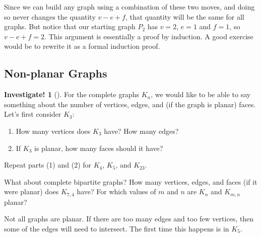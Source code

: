 \documentclass[10pt,]{book}
\theoremstyle{plain}
\theoremstyle{definition}
\theoremstyle{definition}
\theoremstyle{definition}
\newtheorem{investigation}[project]{Investigate!}
\theoremstyle{definition}
\numberwithin{equation}{chapter}
\begin{document}
\par
\hypertarget{p-1602}{}%
Since we can build any graph using a combination of these two moves, and doing so never changes the quantity \(v - e + f\), that quantity will be the same for all graphs. But notice that our starting graph \(P_2\) has \(v = 2\), \(e = 1\) and \(f = 1\), so \(v - e + f = 2\). This argument is essentially a proof by induction. A good exercise would be to rewrite it as a formal induction proof.%
\typeout{************************************************}
\typeout{************************************************}
\subsection[{Non-planar Graphs}]{Non-planar Graphs}\label{subsection-27}
\begin{investigation}[]\label{investigation-21}
\hypertarget{p-1603}{}%
For the complete graphs \(K_n\), we would like to be able to say something about the number of vertices, edges, and (if the graph is planar) faces. Let's first consider \(K_3\): %
\begin{enumerate}
\item\hypertarget{li-721}{}\hypertarget{p-1604}{}%
How many vertices does \(K_3\) have? How many edges?%
\item\hypertarget{li-722}{}\hypertarget{p-1605}{}%
If \(K_3\) is planar, how many faces should it have?%
\end{enumerate}
%
\par
\hypertarget{p-1606}{}%
Repeat parts (1) and (2) for \(K_4\), \(K_5\), and \(K_{23}\).%
\par
\hypertarget{p-1607}{}%
What about complete bipartite graphs? How many vertices, edges, and faces (if it were planar) does \(K_{7,4}\) have?  For which values of \(m\) and \(n\) are \(K_n\) and \(K_{m,n}\) planar?%
\end{investigation}
\hypertarget{p-1608}{}%
Not all graphs are planar. If there are too many edges and too few vertices, then some of the edges will need to intersect. The first time this happens is in \(K_5\).%
\end{document}
